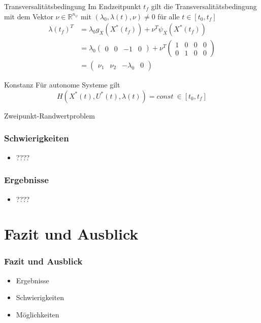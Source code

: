 \documentclass[aspectratio=169]{beamer}
\newcommand{\R}{\mathbb{R}}
\begin{document}
\begin{frame}
\begin{block}{Transversalitätsbedingung} 
  \scriptsize
Im Endzeitpunkt $t_f$ gilt die Transversalitätsbedingung mit dem Vektor $\nu \in \R^{n_{\psi}}$ mit $(\lambda_0,\lambda(t),\nu) \neq 0$ für alle $t \in [t_0,t_f]$
        \[\begin{split}
            \lambda(t_f)^T &= \lambda_0 g_X(X^{\ast}(t_f)) + \nu^T \psi_X(X^{\ast}(t_f)) \\\
            &= \lambda_0 
            \begin{pmatrix}
            0 & 0 & -1 & 0
            \end{pmatrix}  
            + \nu^T 
            \begin{pmatrix}
            1 & 0 & 0 & 0 \\
            0 & 1 & 0 & 0 
            \end{pmatrix}  \\\
            &= \begin{pmatrix}
            \nu_1 & \nu_2 & -\lambda_0 & 0 
            \end{pmatrix}
        \end{split}\]
  \end{block}
  \begin{block}{Konstanz} 
  \scriptsize
 Für autonome Systeme gilt \[H(X^{\ast}(t),U^{\ast}(t), \lambda(t)) = const \ \in [t_0,t_f]\]
   \end{block}
\end{frame}


\begin{frame}
\begin{block}{Zweipunkt-Randwertproblem } 
  \scriptsize

   \end{block}
\end{frame}

\begin{frame}
  \frametitle{Schwierigkeiten}
\vspace{-2.6cm}
  \begin{itemize}
    \item ????
  \end{itemize}
\end{frame}

\begin{frame}
  \frametitle{Ergebnisse}
\vspace{-2.6cm}
  \begin{itemize}
    \item ????
  \end{itemize}
\end{frame}


\section{Fazit und Ausblick}
\begin{frame}
  \frametitle{Fazit und Ausblick}
\vspace{-2.6cm}
  \begin{itemize}
    \item Ergebnisse 
    \item Schwierigkeiten
    \item Möglichkeiten
  \end{itemize}
\end{frame}
\end{document}
